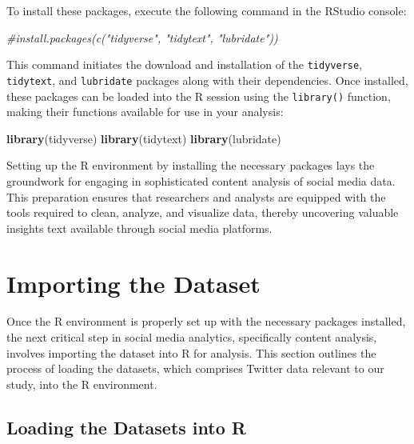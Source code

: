 \documentclass[
]{book}
\newenvironment{Shaded}{\begin{snugshade}}{\end{snugshade}}
\newcommand{\CommentTok}[1]{\textcolor[rgb]{0.56,0.35,0.01}{\textit{#1}}}
\newcommand{\FunctionTok}[1]{\textcolor[rgb]{0.13,0.29,0.53}{\textbf{#1}}}
\newcommand{\NormalTok}[1]{#1}
\begin{document}
To install these packages, execute the following command in the RStudio console:

\begin{Shaded}
\begin{Highlighting}[]
\CommentTok{\#install.packages(c("tidyverse", "tidytext", "lubridate"))}
\end{Highlighting}
\end{Shaded}

This command initiates the download and installation of the \texttt{tidyverse}, \texttt{tidytext}, and \texttt{lubridate} packages along with their dependencies. Once installed, these packages can be loaded into the R session using the \texttt{library()} function, making their functions available for use in your analysis:

\begin{Shaded}
\begin{Highlighting}[]
\FunctionTok{library}\NormalTok{(tidyverse)}
\FunctionTok{library}\NormalTok{(tidytext)}
\FunctionTok{library}\NormalTok{(lubridate)}
\end{Highlighting}
\end{Shaded}

Setting up the R environment by installing the necessary packages lays the groundwork for engaging in sophisticated content analysis of social media data. This preparation ensures that researchers and analysts are equipped with the tools required to clean, analyze, and visualize data, thereby uncovering valuable insights text available through social media platforms.

\hypertarget{importing-the-dataset}{%
\section{Importing the Dataset}\label{importing-the-dataset}}

Once the R environment is properly set up with the necessary packages installed, the next critical step in social media analytics, specifically content analysis, involves importing the dataset into R for analysis. This section outlines the process of loading the datasets, which comprises Twitter data relevant to our study, into the R environment.

\hypertarget{loading-the-datasets-into-r}{%
\subsection{Loading the Datasets into R}\label{loading-the-datasets-into-r}}
\end{document}
